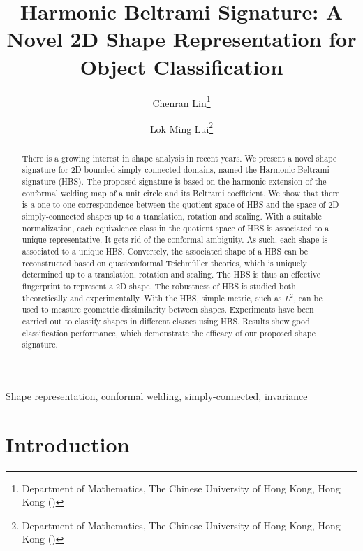 \documentclass[review,onefignum,onetabnum]{siamonline190516}
\begin{document}
\title{Harmonic Beltrami Signature: A Novel 2D Shape Representation for Object Classification}

\author{
    Chenran Lin\thanks{Department of Mathematics, The Chinese University of Hong Kong, Hong Kong ()}
\and
    Lok Ming Lui\thanks{Department of Mathematics, The Chinese University of Hong Kong, Hong Kong ()}
}

\maketitle

\begin{abstract}
  There is a growing interest in shape analysis in recent years. We present a novel shape signature for 2D bounded simply-connected domains, named the Harmonic Beltrami signature (HBS). The proposed signature is based on the harmonic extension of the conformal welding map of a unit circle and its Beltrami coefficient. We show that there is a one-to-one correspondence between the quotient space of HBS and the space of 2D simply-connected shapes up to a translation, rotation and scaling. With a suitable normalization, each equivalence class in the quotient space of HBS is associated to a unique representative. It gets rid of the conformal ambiguity. As such, each shape is associated to a unique HBS. Conversely, the associated shape of a HBS can be reconstructed based on quasiconformal Teichm\"uller theories, which is uniquely determined up to a translation, rotation and scaling. The HBS is thus an effective fingerprint to represent a 2D shape. The robustness of HBS is studied both theoretically and experimentally. With the HBS, simple metric, such as $L^2$, can be used to measure geometric dissimilarity between shapes. Experiments have been carried out to classify shapes in different classes using HBS. Results show good classification performance, which demonstrate the efficacy of our proposed shape signature.
\end{abstract}

\begin{keywords}
  Shape representation, conformal welding, simply-connected, invariance
\end{keywords}

\section{Introduction}
\label{intro}
\end{document}

